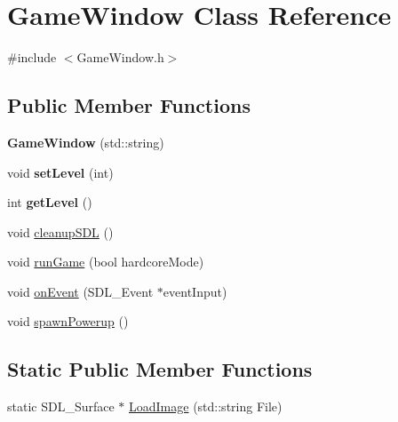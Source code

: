 \hypertarget{class_game_window}{\section{\-Game\-Window \-Class \-Reference}
\label{class_game_window}
}


{\ttfamily \#include $<$\-Game\-Window.\-h$>$}

\subsection*{\-Public \-Member \-Functions}
\begin{DoxyCompactItemize}
\item 
\hypertarget{class_game_window_a9fab47a6eec35e8d3f8c6828ae51503b}{{\bfseries \-Game\-Window} (std\-::string)}\label{class_game_window_a9fab47a6eec35e8d3f8c6828ae51503b}

\item 
\hypertarget{class_game_window_a4f7a14b6d43ec8717e34b2cd07eb4029}{void {\bfseries set\-Level} (int)}\label{class_game_window_a4f7a14b6d43ec8717e34b2cd07eb4029}

\item 
\hypertarget{class_game_window_a78a8c4c8ee659661d14a4b63a05d211d}{int {\bfseries get\-Level} ()}\label{class_game_window_a78a8c4c8ee659661d14a4b63a05d211d}

\item 
void \hyperlink{class_game_window_a86a9c0339df6f7681870efc1c0670255}{cleanup\-S\-D\-L} ()
\item 
void \hyperlink{class_game_window_aca444a7277eac76e10c2cc0d0511d484}{run\-Game} (bool hardcore\-Mode)
\item 
void \hyperlink{class_game_window_a2914cd14f89d276a37666d1941d4cb3b}{on\-Event} (\-S\-D\-L\-\_\-\-Event $\ast$event\-Input)
\item 
void \hyperlink{class_game_window_af36066d5cd69724680747d9c542cc53b}{spawn\-Powerup} ()
\end{DoxyCompactItemize}
\subsection*{\-Static \-Public \-Member \-Functions}
\begin{DoxyCompactItemize}
\item 
static \-S\-D\-L\-\_\-\-Surface $\ast$ \hyperlink{class_game_window_a828662b737004df4945eb7ce4d88e883}{\-Load\-Image} (std\-::string \-File)
\end{DoxyCompactItemize}


